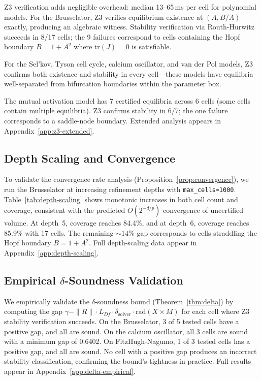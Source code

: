\documentclass[11pt]{article}
\newcommand{\norm}[1]{\|#1\|}
\begin{document}
Z3 verification adds negligible overhead: median 13--65\,ms per cell for polynomial models.
For the Brusselator, Z3 verifies equilibrium existence at $(A, B/A)$ exactly, producing an algebraic witness.
Stability verification via Routh-Hurwitz succeeds in 8/17 cells; the 9 failures correspond to cells containing the Hopf boundary $B = 1 + A^2$ where $\mathrm{tr}(J) = 0$ is satisfiable.

For the Sel'kov, Tyson cell cycle, calcium oscillator, and van der Pol models, Z3 confirms both existence and stability in every cell---these models have equilibria well-separated from bifurcation boundaries within the parameter box.

The mutual activation model has 7 certified equilibria across 6 cells (some cells contain multiple equilibria).  Z3 confirms stability in 6/7; the one failure corresponds to a saddle-node boundary.  Extended analysis appears in Appendix~\ref{app:z3-extended}.

\subsection{Depth Scaling and Convergence}

To validate the convergence rate analysis (Proposition~\ref{prop:convergence}), we run the Brusselator at increasing refinement depths with \texttt{max\_cells=1000}.
Table~\ref{tab:depth-scaling} shows monotonic increases in both cell count and coverage, consistent with the predicted $O(2^{-d/p})$ convergence of uncertified volume.
At depth~5, coverage reaches 84.4\%, and at depth~6, coverage reaches 85.9\% with 17 cells.
The remaining ${\sim}14\%$ gap corresponds to cells straddling the Hopf boundary $B = 1 + A^2$.
Full depth-scaling data appear in Appendix~\ref{app:depth-scaling}.

\subsection{Empirical $\delta$-Soundness Validation}

We empirically validate the $\delta$-soundness bound (Theorem~\ref{thm:delta}) by computing the gap $\gamma - \norm{R} \cdot L_{Df} \cdot \delta_{\mathrm{solver}} \cdot \mathrm{rad}(X \times M)$ for each cell where Z3 stability verification succeeds.
On the Brusselator, 3 of 5 tested cells have a positive gap, and all are sound.
On the calcium oscillator, all 3 cells are sound with a minimum gap of 0.6402.
On FitzHugh-Nagumo, 1 of 3 tested cells has a positive gap, and all are sound.
No cell with a positive gap produces an incorrect stability classification, confirming the bound's tightness in practice.
Full results appear in Appendix~\ref{app:delta-empirical}.
\end{document}
